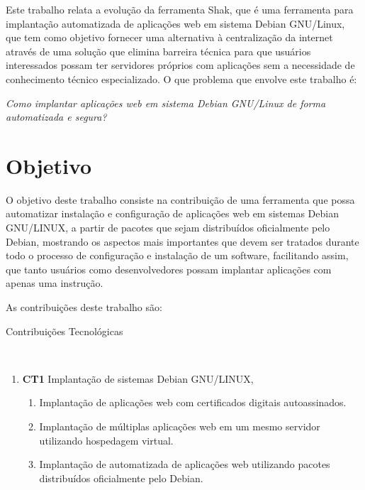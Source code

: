Este trabalho relata a evolução da ferramenta Shak, que é uma ferramenta para implantação
automatizada de aplicações web em sistema Debian GNU/Linux, que tem como objetivo fornecer
uma alternativa à centralização da internet através de uma solução que elimina
barreira técnica para que usuários interessados possam ter servidores próprios
com aplicações sem a necessidade de conhecimento
técnico especializado. O que problema que envolve este trabalho é:

\begin{center}
  \textit{
  Como implantar aplicações web em sistema Debian GNU/Linux de forma automatizada
  e segura?
}
\end{center}

\section{Objetivo}

O objetivo deste trabalho consiste na contribuição de uma ferramenta
que possa automatizar instalação e configuração de aplicações web em sistemas
Debian GNU/LINUX, a partir de pacotes que sejam distribuídos oficialmente pelo
Debian, mostrando os aspectos mais importantes que devem ser tratados durante
todo o processo de configuração e instalação de um software, facilitando assim, que
tanto usuários como desenvolvedores possam implantar aplicações com apenas uma
instrução.

As contribuições deste trabalho são:

\begin{description}
  \item [Contribuições Tecnológicas]\
\end{description}
    \begin{enumerate}
      \item \textbf{CT1} Implantação de sistemas Debian GNU/LINUX,
        \begin{enumerate}
          \item Implantação de aplicações web com certificados digitais autoassinados.
          \item Implantação de múltiplas aplicações web em um mesmo servidor utilizando
          hospedagem virtual.
          \item Implantação de automatizada de aplicações web utilizando pacotes
          distribuídos oficialmente pelo Debian.
        \end{enumerate}
    \end{enumerate}

